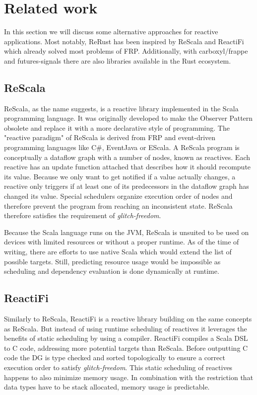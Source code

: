 \chapter{Related work}
\label{related}
In this section we will discuss some alternative approaches for reactive applications. Most notably, \textsf{ReRust} has been inspired by \textsf{ReScala} and \textsf{ReactiFi} which already solved most problems of \ac{FRP}. Additionally, with \textsf{carboxyl/frappe} and \textsf{futures-signals} there are also libraries available in the Rust ecosystem.

\section{ReScala}
\label{related:rescala}
\textsf{ReScala}, as the name suggests, is a reactive library implemented in the Scala programming language. It was originally developed to make the Observer Pattern obsolete and replace it with a more declarative style of programming. The "reactive paradigm" of \textsf{ReScala} is derived from \ac{FRP} and event-driven programming languages like C\#, EventJava or EScala. A \textsf{ReScala} program is conceptually a dataflow graph with a number of nodes, known as reactives. Each reactive has an update function attached that describes how it should recompute its value. Because we only want to get notified if a value actually changes, a reactive only triggers if at least one of its predecessors in the dataflow graph has changed its value. Special schedulers organize execution order of nodes and therefore prevent the program from reaching an inconsistent state. \textsf{ReScala} therefore satisfies the requirement of \emph{glitch-freedom}.

Because the Scala language runs on the \ac{JVM}, \textsf{ReScala} is unsuited to be used on devices with limited resources or without a proper runtime. As of the time of writing, there are efforts to use native Scala which would extend the list of possible targets. Still, predicting resource usage would be impossible as scheduling and dependency evaluation is done dynamically at runtime.

\section{ReactiFi}
\label{related:reactifi}
Similarly to \textsf{ReScala}, \textsf{ReactiFi} is a reactive library building on the same concepts as \textsf{ReScala}. But instead of using runtime scheduling of reactives it leverages the benefits of static scheduling by using a compiler. \textsf{ReactiFi} compiles a Scala \ac{DSL} to C code, addressing more potential targets than \textsf{ReScala}. Before outputting C code the \ac{DG} is type checked and sorted topologically to ensure a correct execution order to satisfy \emph{glitch-freedom}. This static scheduling of reactives happens to also minimize memory usage. In combination with the restriction that data types have to be stack allocated, memory usage is predictable.

